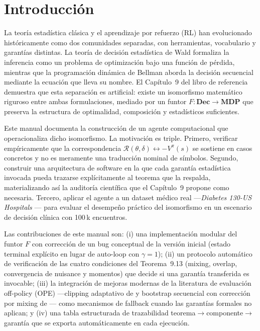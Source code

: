 \documentclass[11pt,a4paper]{article}
\theoremstyle{mitheorem}
\theoremstyle{mitdef}
\newcommand{\Risk}{\mathcal{R}}
\newcommand{\Value}{V}
\newcommand{\discount}{\gamma}
\newcommand{\decrule}{\delta}
\newcommand{\policy}{\pi}
\newcommand{\isoto}{\leftrightarrow}
\begin{document}
\tableofcontents
\newpage

\section{Introducción}

La teoría estadística clásica y el aprendizaje por refuerzo (RL) han
evolucionado históricamente como dos comunidades separadas, con
herramientas, vocabulario y garantías distintas. La teoría de decisión
estadística de Wald \cite{wald1950statistical} formaliza la inferencia
como un problema de optimización bajo una función de pérdida, mientras
que la programación dinámica de Bellman \cite{bellman1957dynamic}
aborda la decisión secuencial mediante la ecuación que lleva su nombre.
El Capítulo~9 del libro de referencia demuestra que esta separación es
artificial: existe un isomorfismo matemático riguroso entre ambas
formulaciones, mediado por un funtor $F:\mathbf{Dec}\to\mathbf{MDP}$
que preserva la estructura de optimalidad, composición y
estadísticos suficientes.

Este manual documenta la construcción de un agente computacional que
operacionaliza dicho isomorfismo. La motivación es triple. Primero,
verificar empíricamente que la correspondencia
$\Risk(\theta,\decrule)\isoto -\Value^\policy(s)$ se sostiene en
casos concretos y no es meramente una traducción nominal de
símbolos. Segundo, construir una arquitectura de software en la que
cada garantía estadística invocada pueda trazarse explícitamente al
teorema que la respalda, materializando así la auditoría científica
que el Capítulo~9 propone como necesaria. Tercero, aplicar el agente
a un dataset médico real ---\textit{Diabetes 130-US Hospitals}
\cite{strack2014impact}--- para evaluar el desempeño práctico del
isomorfismo en un escenario de decisión clínica con 100\,k
encuentros.

Las contribuciones de este manual son: (i) una implementación
modular del funtor $F$ con corrección de un bug conceptual de la
versión inicial (estado terminal explícito en lugar de auto-loop con
$\discount=1$); (ii) un protocolo automático de verificación de las
cuatro condiciones del Teorema~9.13 (mixing, overlap, convergencia de
nuisance y momentos) que decide si una garantía transferida es
invocable; (iii) la integración de mejoras modernas de la literatura
de evaluación off-policy (OPE) ---clipping adaptativo de
\citet{su2020adaptive} y bootstrap secuencial con corrección por
mixing de \citet{liao2021offpolicy}--- como mecanismos de
fallback cuando las garantías formales no aplican; y (iv) una
tabla estructurada de trazabilidad teorema$\to$componente$\to$garantía
que se exporta automáticamente en cada ejecución.
\end{document}
